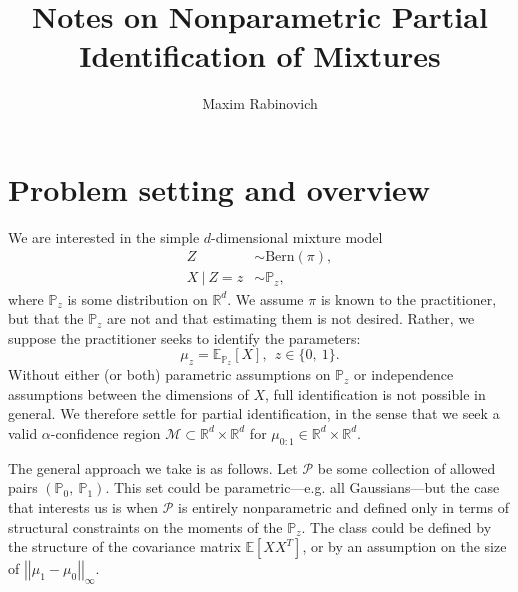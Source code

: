 \documentclass[11pt,twoside]{article}
\newcommand{\E}{\mathbb{E}}
\renewcommand{\P}{\mathbb{P}}
\newcommand{\R}{\mathbb{R}}
\newcommand{\Bern}{\mathrm{Bern}}
\newcommand{\bits}{\lbrace 0,~1\rbrace}
\newcommand{\norm}[1]{\left|\left|{#1}\right|\right|}
\newcommand{\mupart}{\mathcal{M}}
\newcommand{\dists}{\mathcal{P}}
\begin{document}
\title{Notes on Nonparametric Partial Identification of Mixtures}
\author{Maxim Rabinovich}

\maketitle

\section{Problem setting and overview}

We are interested in the simple $d$-dimensional mixture model
\begin{align*}
Z & \sim \Bern\left(\pi\right), \\
X ~|~Z = z & \sim \P_{z},
\end{align*}
where $\P_{z}$ is some distribution on $\R^{d}$. We assume $\pi$ is known to the practitioner, but that the $\P_{z}$ are not and that estimating
them is not desired. Rather, we suppose the practitioner seeks to identify the parameters:
\begin{equation*}
\mu_{z} = \E_{\P_{z}}\left[X\right], ~~z \in \bits .
\end{equation*}
Without either (or both) parametric assumptions on $\P_{z}$ or independence assumptions between the dimensions of $X$, full identification is not possible in general. We therefore settle for partial identification, in the sense that we seek a valid $\alpha$-confidence region $\mupart \subset \R^{d} \times \R^{d}$ for
$\mu_{0:1} \in \R^{d} \times \R^{d}$. 

The general approach we take is as follows. Let $\dists$ be some collection of allowed pairs $\left(\P_{0},~\P_{1}\right)$. This set could be parametric---e.g. all Gaussians---but the case that interests us is when $\dists$ is entirely nonparametric and defined only in terms of structural constraints on the moments of the $\P_{z}$. The class could be defined by the structure of the covariance matrix $\E\left[XX^{T}\right]$, or by an assumption on the size of $\norm{\mu_{1} - \mu_{0}}_{\infty}$. 
\end{document}
